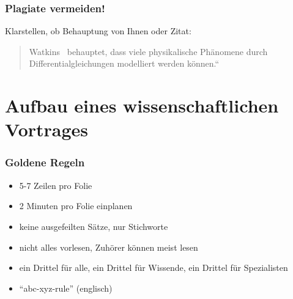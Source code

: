 \documentclass[10pt]{beamer} %
\begin{document}
\begin{frame}
  \frametitle{Plagiate vermeiden!}
  
  Klarstellen, ob Behauptung von Ihnen oder Zitat:
  \begin{quotation}\noindent
    Watkins~\cite[Seite~18]{Watkins:2002} behauptet, dass
    viele physikalische Phänomene durch Differentialgleichungen
    modelliert werden können.“
  \end{quotation}


  \vspace*{1em}


\end{frame}
\section{Aufbau eines wissenschaftlichen Vortrages }
\begin{frame}
  \frametitle{Goldene Regeln}

  \begin{itemize}
  \item 5-7 Zeilen pro Folie
  \item 2 Minuten pro Folie einplanen
  \item keine ausgefeilten Sätze, nur Stichworte
  \item nicht alles vorlesen, Zuhörer können meist lesen
  \item ein Drittel für alle, ein Drittel für Wissende, ein Drittel
    für Spezialisten
  \item “abc-xyz-rule” (englisch)
  \end{itemize}


\end{frame}
\end{document}

